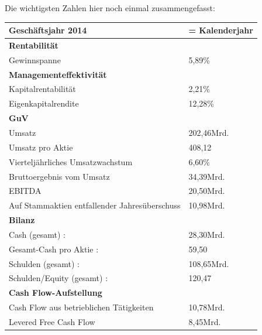 \documentclass[12pt]{article}
\begin{document}
\newpage
Die wichtigsten Zahlen hier noch einmal zusammengefasst:
\begin{table}
\begin{tabular}{|p{}|p{}|}
\hline
\textbf{Geschäftsjahr 2014}  & = Kalenderjahr \\  \hline
\textbf{Rentabilität}  & \\  \hline
 Gewinnspanne &   5,89\% \\ \hline
 \textbf{Managementeffektivität}  & \\  \hline
Kapitalrentabilität  & 2,21\%  \\  
Eigenkapitalrendite  &   12,28\%  \\  \hline
 \textbf{GuV}  & \\  \hline

 Umsatz &   202,46Mrd. \\  
 Umsatz pro Aktie &  408,12  \\  
 
Vierteljährliches Umsatzwachstum &   6,60\% \\  
 Bruttoergebnis vom Umsatz &34,39Mrd.    \\  
EBITDA  &  20,50Mrd.  \\  
 Auf Stammaktien entfallender Jahresüberschuss  &  10,98Mrd.  \\  \hline
  \textbf{Bilanz}  & \\  \hline


Cash (gesamt) : &  	28,30Mrd.  \\  

Gesamt-Cash pro Aktie : & 59,50   \\  
Schulden (gesamt) : &   108,65Mrd. \\  
 Schulden/Equity (gesamt) :&  	120,47  \\  \hline
   \textbf{Cash Flow-Aufstellung}  & \\  \hline

Cash Flow aus betrieblichen Tätigkeiten  &  10,78Mrd.  \\  
Levered Free Cash Flow  &  8,45Mrd.  \\  \hline

\end{tabular}
\end{table}
\cite{yahoofinanzenvw}

\newpage
\end{document}
